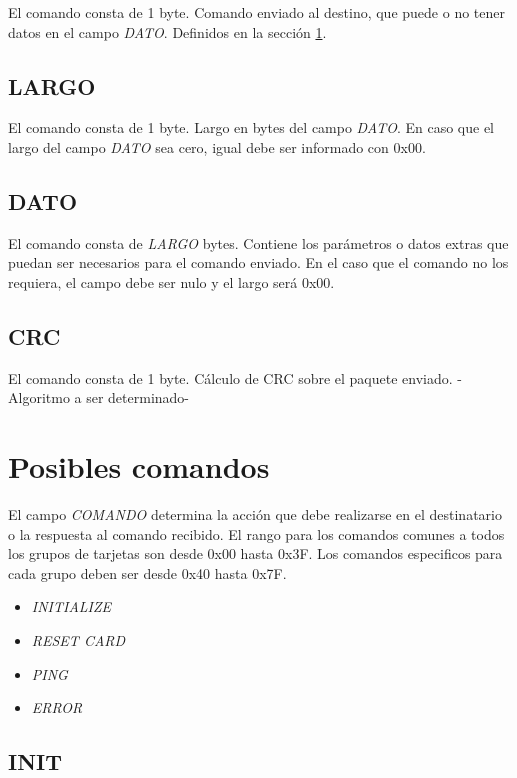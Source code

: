 \documentclass[a4paper,10pt]{article}
\begin{document}
	El comando consta de 1 byte.
	Comando enviado al destino, que puede o no tener datos en el campo \emph{DATO}.
	Definidos en la secci\'on \ref{comandos}.

\subsection{LARGO}
\label{largo}

	El comando consta de 1 byte.
	Largo en bytes del campo \emph{DATO}.
	En caso que el largo del campo \emph{DATO} sea cero, igual debe ser informado con 0x00.

\subsection{DATO}
\label{dato}

	El comando consta de \emph{LARGO} bytes.
	Contiene los par\'ametros o datos extras que puedan ser necesarios para el comando enviado.
	En el caso que el comando no los requiera, el campo debe ser nulo y el largo ser\'a 0x00.

\subsection{CRC}
\label{crc}

	El comando consta de 1 byte.
	C\'alculo de CRC sobre el paquete enviado.
	-Algoritmo a ser determinado-

\section{Posibles comandos}
\label{comandos}

El campo \emph{COMANDO} determina la acci\'on que debe realizarse en el destinatario o la respuesta al comando recibido.
El rango para los comandos comunes a todos los grupos de tarjetas son desde 0x00 hasta 0x3F.
Los comandos especificos para cada grupo deben ser desde 0x40 hasta 0x7F.

\begin{itemize}
	\item \emph{INITIALIZE}
	\item \emph{RESET CARD}
	\item \emph{PING}
	\item \emph{ERROR}
\label{lista_comandos}
\end{itemize}

\subsection{INIT}
\label{init}
\end{document}
